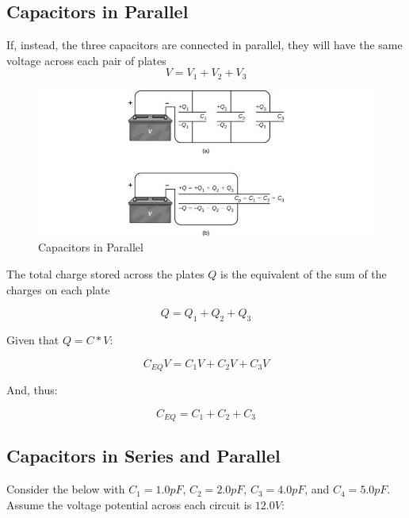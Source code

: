 \documentclass[14pt]{memoir}
\begin{document}
\subsection{Capacitors in Parallel}

If, instead, the three capacitors are connected in parallel, they will have the same voltage across each pair of plates
\begin{equation}
V = V_1 + V_2 + V_3
\end{equation}

\begin{figure}[H]
\begin{center}
\includegraphics[scale=0.60]{fig/fig_08_12.jpg}
\caption{Capacitors in Parallel}
\label{fig:08_12}
\end{center}
\end{figure}

The total charge stored across the plates $Q$ is the equivalent of the sum of the charges on each plate

\begin{equation}
Q = Q_1 + Q_2 + Q_3
\end{equation}

Given that $Q = C * V$:

\begin{equation}
C_{EQ}V = C_{1}V + C_{2}V + C_{3}V
\end{equation}

And, thus:

\begin{equation}
C_{EQ} = C_{1} + C_{2} + C_{3}
\end{equation}


\subsection{Capacitors in Series and Parallel}

Consider the below with $C_1 = 1.0 pF$, $C_2 = 2.0 pF$, $C_3 = 4.0 pF$, and $C_4 = 5.0 pF$. Assume the voltage potential across each circuit is $12.0V$:
\end{document}
